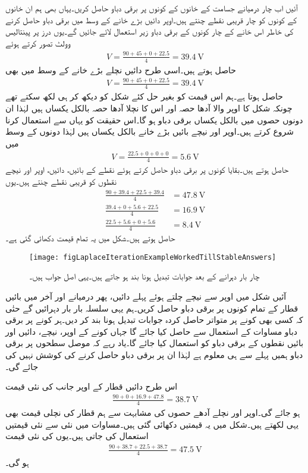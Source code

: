 آئیں اب چار درمیانے جسامت کے خانوں کے کونوں پر برقی دباو حاصل کریں۔یہاں بھی ہم ان خانوں کے کونوں کو چار قریبی نقطے چنتے ہیں۔اوپر دائیں بڑے خانے کے وسط میں برقی دباو حاصل کرنے کی خاطر اس خانے کے چار کونوں کے برقی دباو زیر استعمال لائے جائیں گے۔یوں درز پر پینتالیس وولٹ تصور کرتے ہوئے
\begin{align*}
V=\frac{90+45+0+22.5}{4}=\SI{39.4}{\volt}
\end{align*}
حاصل ہوتے ہیں۔اسی طرح دائیں نچلے بڑے خانے کے وسط میں بھی
\begin{align*}
V=\frac{90+45+0+22.5}{4}=\SI{39.4}{\volt}
\end{align*}
حاصل ہوتا ہے۔ہم اس قیمت کو بغیر حل کئے شکل کو دیکھ کر ہی لکھ سکتے تھے چونکہ شکل کا اوپر والا آدھا حصہ اور اس کا نچلا آدھا حصہ بالکل یکساں ہیں لہٰذا ان دونوں حصوں میں بالکل یکساں برقی دباو ہو گا۔اس حقیقت کو یہاں سے استعمال کرنا شروع کرتے ہیں۔اوپر اور نیچے بائیں بڑے خانے بالکل یکساں ہیں لہٰذا دونوں کے وسط میں
\begin{align*}
V=\frac{22.5+0+0+0}{4}=\SI{5.6}{\volt}
\end{align*}
حاصل ہوتے ہیں۔بقایا کونوں پر برقی دباو حاصل کرتے ہوئے نقطے کے بائیں، دائیں، اوپر اور نیچے نقطوں کو قریبی نقطے چنتے ہیں۔یوں
\begin{align*}
\frac{90+39.4+22.5+39.4}{4}&=\SI{47.8}{\volt}\\
\frac{39.4+0+5.6+22.5}{4}&=\SI{16.9}{\volt}\\
\frac{22.5+5.6+0+5.6}{4}&=\SI{8.4}{\volt}
\end{align*}
حاصل ہوتے ہیں۔شکل  میں یہ تمام قیمت دکھائی گئی ہے۔

\begin{figure}
\centering
\texttt{[image: figLaplaceIterationExampleWorkedTillStableAnswers]}
\caption{چار بار دہرانے کے بعد جوابات تبدیل ہونا بند ہو جاتے ہیں۔یہی اصل جواب ہیں۔}
\label{شکل_لاپلاس_دہرانے_کے_اٹل_جواب}
\end{figure}

آئیں شکل میں اوپر سے نیچے چلتے ہوئے پہلے دائیں، پھر درمیانے اور آخر میں بائیں قطار  کے تمام کونوں پر برقی دباو حاصل کریں۔ہم یہی سلسلہ بار بار دہرائیں گے حتٰی کہ کسی بھی کونے پر متواتر حاصل کردہ جوابات تبدیل ہونا بند کر دیں۔ہر کونے پر برقی دباو مساوات  کے استعمال سے حاصل کیا جائے گا جہاں کونے کے اوپر، نیچے، دائیں اور بائیں نقطوں کے برقی دباو کو استعمال کیا جائے گا۔یاد رہے کہ موصل سطحوں پر برقی دباو ہمیں پہلے  سے ہی معلوم ہے لہٰذا ان پر برقی دباو حاصل کرنے کی کوشش نہیں کی جائے گی۔

اس طرح دائیں قطار کے اوپر جانب  کی نئی قیمت
\begin{align*}
\frac{90+0+16.9+47.8}{4}=\SI{38.7}{\volt}
\end{align*}
ہو جائے گی۔اوپر اور نچلے آدھے حصوں کی مشابہت سے ہم قطار کی نچلی قیمت بھی یہی لکھتے ہیں۔شکل  میں یہ قیمتیں دکھائی گئی ہیں۔مساوات   میں نئی سے نئی قیمتیں استعمال کی جاتی ہیں۔یوں  کی نئی قیمت
\begin{align*}
\frac{90+38.7+22.5+38.7}{4}=\SI{47.5}{\volt}
\end{align*}
ہو گی۔

